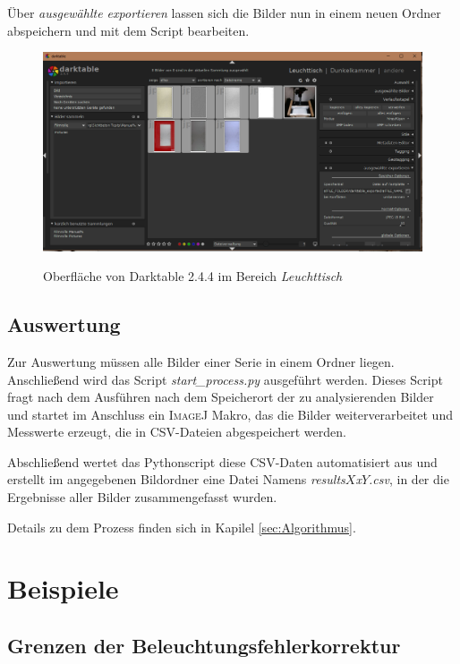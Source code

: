 \documentclass{article}
\begin{document}
Über \textit{ausgewählte exportieren} lassen sich die Bilder nun in einem neuen Ordner abspeichern und mit dem Script bearbeiten.

\begin{figure}[htbp]
	\centering
	\includegraphics[width=\textwidth]{pictures/Darktable.png}
	\label{pic:darktable}
	\caption{Oberfläche von Darktable 2.4.4 im Bereich \textit{Leuchttisch}}
\end{figure}

\subsection{Auswertung}

Zur Auswertung müssen alle Bilder einer Serie in einem Ordner liegen. Anschließend wird das Script \textit{start\_process.py} ausgeführt werden. Dieses Script fragt nach dem Ausführen nach dem Speicherort der zu analysierenden Bilder und startet im Anschluss ein \textsc{ImageJ} Makro, das die Bilder weiterverarbeitet und Messwerte erzeugt, die in CSV-Dateien abgespeichert werden.

Abschließend wertet das Pythonscript diese CSV-Daten automatisiert aus und erstellt im angegebenen Bildordner eine Datei Namens \textit{results$X$x$Y$.csv}, in der die Ergebnisse aller Bilder zusammengefasst wurden.

Details zu dem Prozess finden sich in Kapilel \ref{sec:Algorithmus}.


\section{Beispiele}
\subsection{Grenzen der Beleuchtungsfehlerkorrektur}
\end{document}
